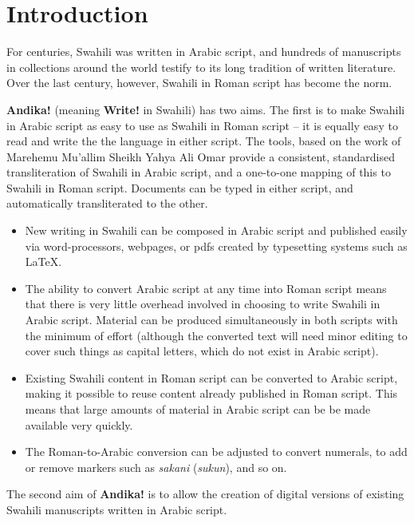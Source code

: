 \chapter{Introduction}
\label{ch:intro}

For centuries, Swahili was written in Arabic script, and hundreds of manuscripts in collections around the world testify to its long tradition of written literature. Over the last century, however, Swahili in Roman script has become the norm.

\textbf{Andika!} (meaning \textbf{Write!} in Swahili) has two aims.  The first is to make Swahili in Arabic script as easy to use as Swahili in Roman script -- it is equally easy to read and write the the language in either script. The tools, based on the work of Marehemu Mu'allim Sheikh Yahya Ali Omar \citep{Omar1997} provide a consistent, standardised transliteration of Swahili in Arabic script, and a one-to-one mapping of this to Swahili in Roman script.  Documents can be typed in either script, and automatically transliterated to the other.

\begin{itemize}
\item New writing in Swahili can be composed in Arabic script and published easily via word-processors, webpages, or pdfs created by typesetting systems such as LaTeX.

\item The ability to convert Arabic script at any time into Roman script means that there is very little overhead involved in choosing to write Swahili in Arabic script. Material can be produced simultaneously in both scripts with the minimum of effort (although the converted text will need minor editing to cover such things as capital letters, which do not exist in Arabic script).

\item Existing Swahili content in Roman script can be converted to Arabic script, making it possible to reuse content already published in Roman script. This means that large amounts of material in Arabic script can be be made available very quickly.

\item The Roman-to-Arabic conversion can be adjusted to convert numerals, to add or remove markers such as \textit{sakani} (\textit{sukun}), and so on.
\end{itemize}

The second aim of \textbf{Andika!} is to allow the creation of digital versions of existing Swahili manuscripts written in Arabic script.

